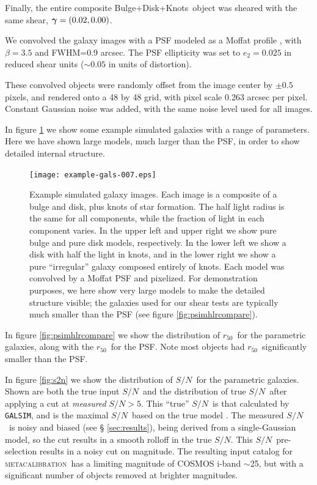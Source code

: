 \documentclass[iop]{emulateapj}
\newcommand{\snr}{$S/N$}
\newcommand{\hlr}{$r_{50}$}
\newcommand{\vecg}{\mbox{\boldmath $\gamma$}}
\newcommand{\mcal}{\textsc{metacalibration}}
\newcommand{\bdkfull}{Bulge+Disk+Knots}
\newcommand{\galsim}{\texttt{GALSIM}}
\begin{document}
Finally, the entire composite \bdkfull\ object was sheared with the same
shear, $\vecg = (0.02, 0.00)$.

We convolved the galaxy images with a PSF modeled as a Moffat profile
\citep{Moffat1969}, with $\beta=3.5$ and FWHM=0.9 arcsec. The PSF ellipticity
was set to $e_2 = 0.025$ in reduced shear units ($\sim0.05$ in units of
distortion). 

These convolved objects were randomly offset from the image center by $\pm 0.5$
pixels, and rendered onto a 48 by 48 grid, with pixel scale 0.263 arcsec per
pixel. Constant Gaussian noise was added, with the same noise level used for
all images. 

In figure \ref{fig:parametricgals} we show some example simulated galaxies with
a range of parameters.  Here we have shown large models, much larger than the
PSF, in order to show detailed internal structure.

\begin{figure}[p]
    \centering
    \texttt{[image: example-gals-007.eps]}

    \caption{Example simulated galaxy images.  Each image is a composite of a
    bulge and disk, plus knots of star formation.  The half light radius is the
    same for all components, while the fraction of light in each component
    varies.  In the upper left and upper right we show pure bulge and pure disk
    models, respectively.  In the lower left we show a disk with half the light
    in knots, and in the lower right we show a pure ``irregular'' galaxy
    composed entirely of knots.  Each model was convolved by a Moffat PSF
	and pixelized.  For demonstration purposes, we here show very
    large models to make the detailed structure visible; the galaxies used for
    our shear tests are typically much smaller than the PSF (see figure
	\ref{fig:psimhlrcompare}). }

	\label{fig:parametricgals}

\end{figure}

In figure \ref{fig:psimhlrcompare} we show the distribution of \hlr\ for the
parametric galaxies, along with the \hlr\ for the PSF.  Note most objects had
\hlr\ significantly smaller than the PSF.

In figure \ref{fig:s2n} we show the distribution of \snr\ for the parametric
galaxies.   Shown are both the true input \snr\ and the distribution of true
\snr\ after applying a cut at {\it measured} \snr$ > 5$.  This ``true'' \snr\
is that calculated by \galsim, and is the maximal \snr\ based on the true model
\citep{Jarvis2016}.  The measured \snr\ is noisy and biased (see \S
\ref{sec:results}), being derived from a single-Gaussian model, so the cut
results in a smooth rolloff in the true \snr.  This \snr\ pre-selection results
in a noisy cut on magnitude.  The resulting input catalog for \mcal\ has a
limiting magnitude of COSMOS i-band $\sim$25, but with a significant number
of objects removed at brighter magnitudes.
\end{document}
